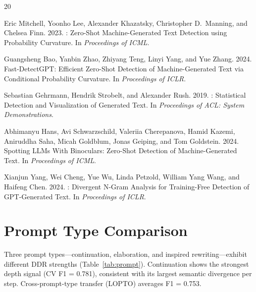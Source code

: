 \documentclass[11pt,a4paper]{article}
\begin{document}

\begin{thebibliography}{20}

Eric Mitchell, Yoonho Lee, Alexander Khazatsky, Christopher D.\ Manning, and Chelsea Finn. 2023.
: Zero-Shot Machine-Generated Text Detection using Probability Curvature.
\newblock In \emph{Proceedings of ICML}.

Guangsheng Bao, Yanbin Zhao, Zhiyang Teng, Linyi Yang, and Yue Zhang. 2024.
\newblock Fast-{DetectGPT}: Efficient Zero-Shot Detection of Machine-Generated Text via Conditional Probability Curvature.
\newblock In \emph{Proceedings of ICLR}.

Sebastian Gehrmann, Hendrik Strobelt, and Alexander Rush. 2019.
: Statistical Detection and Visualization of Generated Text.
\newblock In \emph{Proceedings of ACL: System Demonstrations}.

Abhimanyu Hans, Avi Schwarzschild, Valeriia Cherepanova, Hamid Kazemi, Aniruddha Saha, Micah Goldblum, Jonas Geiping, and Tom Goldstein. 2024.
\newblock Spotting {LLMs} With Binoculars: Zero-Shot Detection of Machine-Generated Text.
\newblock In \emph{Proceedings of ICML}.

Xianjun Yang, Wei Cheng, Yue Wu, Linda Petzold, William Yang Wang, and Haifeng Chen. 2024.
: Divergent N-Gram Analysis for Training-Free Detection of {GPT}-Generated Text.
\newblock In \emph{Proceedings of ICLR}.

\end{thebibliography}

\clearpage
\appendix

\section{Prompt Type Comparison}
\label{app:prompt}

Three prompt types---continuation, elaboration, and inspired rewriting---exhibit different DDR strengths (Table~\ref{tab:prompt}).
Continuation shows the strongest depth signal (CV F1 = 0.781), consistent with its largest semantic divergence per step.
Cross-prompt-type transfer (LOPTO) averages F1 = 0.753.
\end{document}
